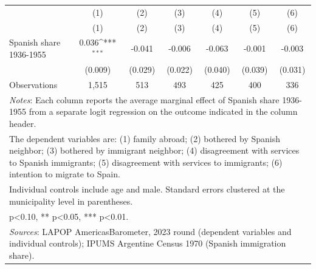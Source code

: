 {
\def\sym#1{\ifmmode^{#1}\else\(^{#1}\)\fi}
\begin{tabular}{l*{6}{c}}
\toprule
            &\multicolumn{1}{c}{(1)}&\multicolumn{1}{c}{(2)}&\multicolumn{1}{c}{(3)}&\multicolumn{1}{c}{(4)}&\multicolumn{1}{c}{(5)}&\multicolumn{1}{c}{(6)}\\
            &\multicolumn{1}{c}{(1)}&\multicolumn{1}{c}{(2)}&\multicolumn{1}{c}{(3)}&\multicolumn{1}{c}{(4)}&\multicolumn{1}{c}{(5)}&\multicolumn{1}{c}{(6)}\\
\midrule
Spanish share 1936-1955&       0.036\sym{***}&      -0.041         &      -0.006         &      -0.063         &      -0.001         &      -0.003         \\
            &     (0.009)         &     (0.029)         &     (0.022)         &     (0.040)         &     (0.039)         &     (0.031)         \\
\midrule
Observations&       1,515         &         513         &         493         &         425         &         400         &         336         \\
\bottomrule
\multicolumn{7}{l}{\footnotesize \textit{Notes}: Each column reports the average marginal effect of Spanish share 1936-1955 from a separate logit regression on the outcome indicated in the column header.}\\
\multicolumn{7}{l}{\footnotesize The dependent variables are: (1) family abroad; (2) bothered by Spanish neighbor; (3) bothered by immigrant neighbor; (4) disagreement with services to Spanish immigrants; (5) disagreement with services to immigrants; (6) intention to migrate to Spain.}\\
\multicolumn{7}{l}{\footnotesize Individual controls include age and male. Standard errors clustered at the municipality level in parentheses.}\\
\multicolumn{7}{l}{\footnotesize * p<0.10, ** p<0.05, *** p<0.01.}\\
\multicolumn{7}{l}{\footnotesize \textit{Sources}: LAPOP AmericasBarometer, 2023 round (dependent variables and individual controls); IPUMS Argentine Census 1970 (Spanish immigration share).}\\
\end{tabular}
}
